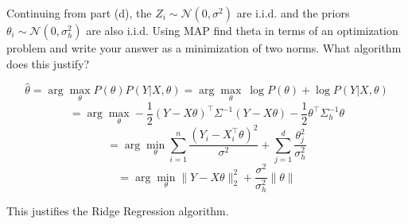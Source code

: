 \begin{Parts}
\Part
Continuing from part (d), the $Z_i \sim \mathcal N(0, \sigma^2)$ are i.i.d. and the priors $\theta_i \sim \mathcal N(0, \sigma^2_h)$ are also i.i.d. Using MAP find theta in terms of an optimization problem and write your answer as a minimization of two norms. What algorithm does this justify?

\begin{solution}
    $$\hat \theta = \arg \max_\theta P(\theta)P(Y| X, \theta) = \arg \max_\theta \ \log P(\theta) + \log P(Y| X, \theta) $$
    $$ = \arg \max_\theta -\frac{1}{2} (Y - X\theta)^\top \Sigma^{-1} (Y - X\theta) - \frac{1}{2} \theta^\top \Sigma^{-1}_h\theta
    $$
    $$ = \arg \min_\theta 
    \sum_{i=1}^{n} \frac{(Y_i - X_i^\top \theta)^2}{\sigma^2} + \sum_{j=1}^{d} \frac{\theta_j^2}{\sigma^2_h}
    $$
    $$ = \arg \min_\theta \|Y-X\theta\|^2_2 + \frac{\sigma^2}{\sigma^2_h}\|\theta\| $$
    
    This justifies the Ridge Regression algorithm.
\end{solution}

\end{Parts}